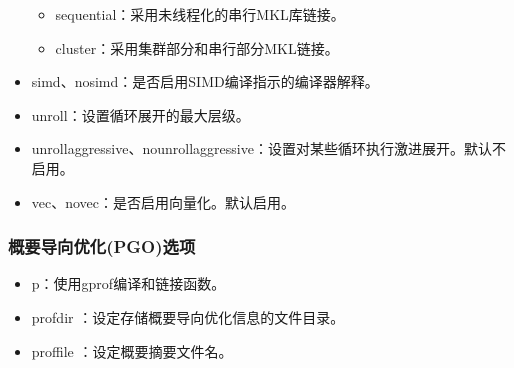 \documentclass[a4paper,12pt,english]{sphinxmanual}
\begin{document}
\begin{itemize}
\begin{itemize}
\item {} 
\sphinxAtStartPar
sequential：采用未线程化的串行MKL库链接。

\item {} 
\sphinxAtStartPar
cluster：采用集群部分和串行部分MKL链接。

\end{itemize}

\item {} 
\sphinxAtStartPar
\sphinxhyphen{}simd、\sphinxhyphen{}no\sphinxhyphen{}simd：是否启用SIMD编译指示的编译器解释。

\item {} 
\sphinxAtStartPar
\sphinxhyphen{}unroll\sphinxstyleemphasis{{[}=n{]}}：设置循环展开的最大层级。

\item {} 
\sphinxAtStartPar
\sphinxhyphen{}unroll\sphinxhyphen{}aggressive、\sphinxhyphen{}no\sphinxhyphen{}unroll\sphinxhyphen{}aggressive：设置对某些循环执行激进展开。默认不启用。

\item {} 
\sphinxAtStartPar
\sphinxhyphen{}vec、\sphinxhyphen{}no\sphinxhyphen{}vec：是否启用向量化。默认启用。

\end{itemize}


\subsubsection{概要导向优化(PGO)选项}
\label{\detokenize{compiler/intel:pgo}}\begin{itemize}
\item {} 
\sphinxAtStartPar
\sphinxhyphen{}p：使用gprof编译和链接函数。

\item {} 
\sphinxAtStartPar
\sphinxhyphen{}prof\sphinxhyphen{}dir ：设定存储概要导向优化信息的文件目录。

\item {} 
\sphinxAtStartPar
\sphinxhyphen{}prof\sphinxhyphen{}file ：设定概要摘要文件名。

\end{itemize}
\end{document}
